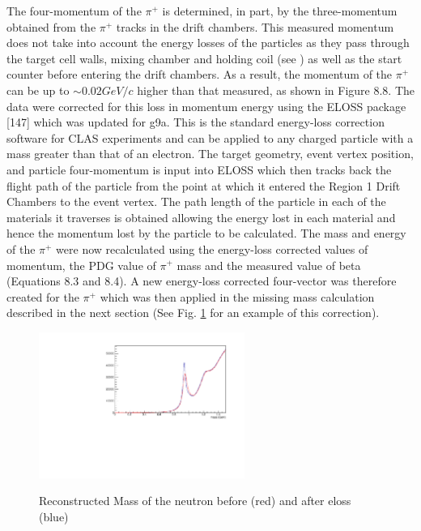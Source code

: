 The four-momentum of the $\pi^+$ is determined, in part, by the three-momentum obtained from the $\pi^+$ tracks in the drift chambers. This measured momentum does not take into account the energy losses of the particles as they pass through the target cell walls, mixing chamber and holding coil (see \cite{Keith_2012}) as well as the start counter before entering the drift chambers. As a result, the momentum of the $\pi^+$ can be up to $\sim 0.02 GeV/c$ higher than that measured, as shown in Figure 8.8.
The data were corrected for this loss in momentum energy using the ELOSS package [147] which was updated for g9a. This is the standard energy-loss correction software for CLAS experiments and can be applied to any charged particle with a mass greater than that of an electron. The target geometry, event vertex position, and particle four-momentum is input into ELOSS which then tracks back the flight path of the particle from the point at which it entered the Region 1 Drift Chambers to the event vertex. The path length of the particle in each of the materials it traverses is obtained allowing the energy lost in each material and hence the momentum lost by the particle to be calculated. The mass and energy of the $\pi^+$ were now recalculated using the energy-loss corrected values of momentum, the PDG value of $\pi^+$ mass and the measured value of beta (Equations 8.3 and 8.4). A new energy-loss corrected four-vector was therefore created for the $\pi^+$ which was then applied in the missing mass calculation described in the next section (See Fig. \ref{fig:eloss_comp} for an example of this correction).
\begin{figure}[htb]
  \begin{center}
    \includegraphics[width=0.6\textwidth]{figures/eloss_comp.pdf} \\
    \caption{Reconstructed Mass of the neutron before (red) and after eloss (blue)}
    \label{fig:eloss_comp}
  \end{center}
\end{figure}



